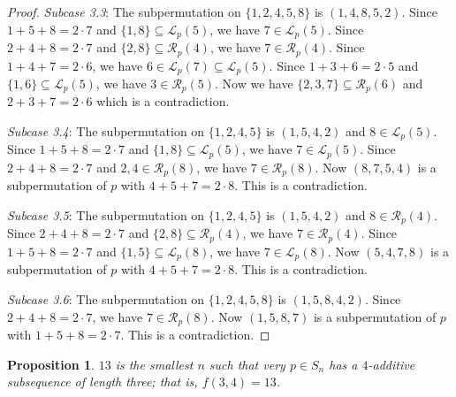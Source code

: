 \documentclass[11pt]{article}
\newtheorem{proposition}[theorem]{Proposition}
\theoremstyle{definition}
\begin{document}
\begin{proof}
\textit{Subcase 3.3}: The subpermutation on $\{1,2,4,5,8\}$ is $(1,4,8,5,2)$. Since $1+5+8=2\cdot7$ and $\{1,8\}\subseteq\mathcal{L}_p(5)$, we have $7\in\mathcal{L}_p(5)$. Since $2+4+8=2\cdot7$ and $\{2,8\}\subseteq\mathcal{R}_p(4)$, we have $7\in\mathcal{R}_p(4)$. Since $1+4+7=2\cdot6$, we have $6\in\mathcal{L}_p(7)\subseteq\mathcal{L}_p(5)$. Since $1+3+6=2\cdot5$ and $\{1,6\}\subseteq\mathcal{L}_p(5)$, we have $3\in\mathcal{R}_p(5)$. Now we have $\{2,3,7\}\subseteq\mathcal{R}_p(6)$ and $2+3+7=2\cdot6$ which is a contradiction.

\textit{Subcase 3.4}: The subpermutation on $\{1,2,4,5\}$ is $(1,5,4,2)$ and $8\in\mathcal{L}_p(5)$. Since $1+5+8=2\cdot7$ and $\{1,8\}\subseteq\mathcal{L}_p(5)$, we have $7\in\mathcal{L}_p(5)$. Since $2+4+8=2\cdot7$ and $2,4\in\mathcal{R}_p(8)$, we have $7\in\mathcal{R}_p(8)$. Now $(8,7,5,4)$ is a subpermutation of $p$ with $4+5+7=2\cdot8$. This is a contradiction.

\textit{Subcase 3.5}: The subpermutation on $\{1,2,4,5\}$ is $(1,5,4,2)$ and $8\in\mathcal{R}_p(4)$. Since $2+4+8=2\cdot7$ and $\{2,8\}\subseteq\mathcal{R}_p(4)$, we have $7\in\mathcal{R}_p(4)$. Since $1+5+8=2\cdot7$ and $\{1,5\}\subseteq\mathcal{L}_p(8)$, we have $7\in\mathcal{L}_p(8)$. Now $(5,4,7,8)$ is a subpermutation of $p$ with $4+5+7=2\cdot8$. This is a contradiction.

\textit{Subcase 3.6}: The subpermutation on $\{1,2,4,5,8\}$ is $(1,5,8,4,2)$. Since $2+4+8=2\cdot7$, we have $7\in\mathcal{R}_p(8)$. Now $(1,5,8,7)$ is a subpermutation of $p$ with $1+5+8=2\cdot7$. This is a contradiction.
\end{proof}    

\begin{proposition}
$13$ is the smallest $n$ such that very $p\in S_n$ has a $4$-additive subsequence of length three; that is, $f(3,4)=13$.
\end{proposition}
\end{document}
